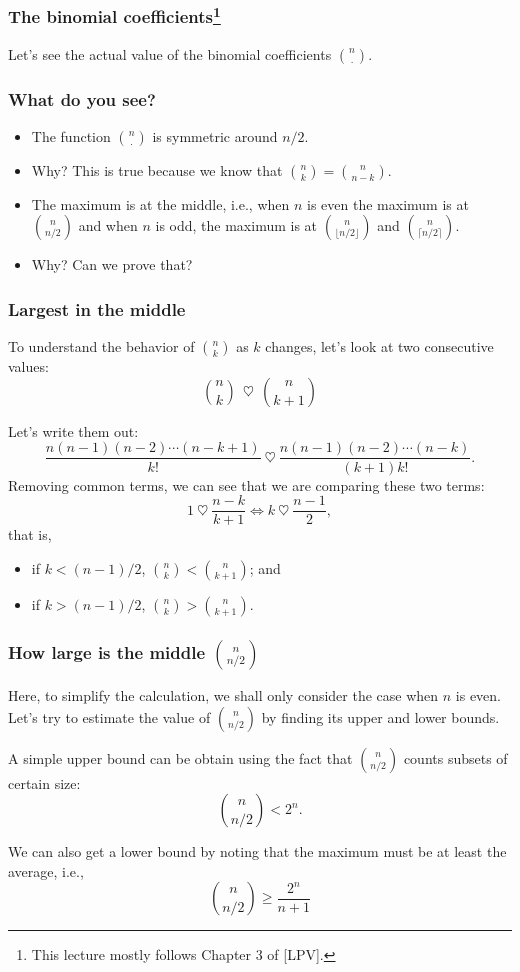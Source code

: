 

\begin{frame}\frametitle{The binomial coefficients\footnote{This lecture mostly follows Chapter 3 of [LPV].}}
\end{frame}

\begin{frame}
  Let's see the actual value of the binomial coefficients
  $\binom{n}{\cdot}$.
  \vspace{2in}
\end{frame}

\begin{frame}\frametitle{What do you see?}
  \begin{itemize}
  \item The function $\binom{n}{\cdot}$ is symmetric around $n/2$.
  \item Why? \pause This is true because we know that $\binom{n}{k}=\binom{n}{n-k}$. \pause
  \item The maximum is at the middle, i.e., when $n$ is even the
    maximum is at $\binom{n}{n/2}$ and when $n$ is odd, the maximum is
    at $\binom{n}{\lfloor n/2 \rfloor}$ and $\binom{n}{\lceil
      n/2\rceil}$.
  \item Why? \pause Can we prove that?
  \end{itemize}
\end{frame}

\begin{frame}\frametitle{Largest in the middle}
  To understand the behavior of $\binom{n}{k}$ as $k$ changes, let's
  look at two consecutive values:
  \[ \binom{n}{k} \ \ \heartsuit \ \ \binom{n}{k+1}\]
  \pause

  Let's write them out:
  \[ \frac{n(n-1)(n-2)\cdots(n-k+1)}{k!} \ \heartsuit \ \frac{n(n-1)(n-2)\cdots(n-k)}{(k+1)k!}.\]
  \pause
  Removing common terms, we can see that we are comparing these two terms:
  \[ 1 \ \heartsuit \ \frac{n-k}{k+1} \Leftrightarrow k \ \heartsuit \ \frac{n-1}{2},\]
  that is, \pause
  \begin{itemize}
  \item if $k<(n-1)/2$, $\binom{n}{k}<\binom{n}{k+1}$; and
  \item if $k>(n-1)/2$, $\binom{n}{k} > \binom{n}{k+1}$.
  \end{itemize}
\end{frame}

\begin{frame}\frametitle{How large is the middle $\binom{n}{n/2}$}
  Here, to simplify the calculation, we shall only consider the case
  when $n$ is even. Let's try to estimate the value of
  $\binom{n}{n/2}$ by finding its upper and lower bounds.
  \pause

  A simple upper bound can be obtain using the fact that
  $\binom{n}{n/2}$ counts subsets of certain size:
  \[\binom{n}{n/2} < 2^n.\]
  \pause

  We can also get a lower bound by noting that the maximum must be at
  least the average, i.e.,
  \[\binom{n}{n/2} \geq \frac{2^n}{n+1}\]
\end{frame}


